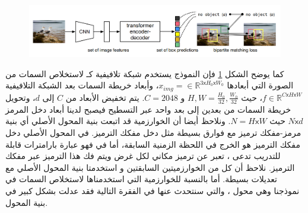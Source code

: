 \begin{figure}[h!]
	\centerline{\includegraphics[width=\textwidth]{images/DETR}}
	\caption{
	}
	\label{fig:DETR}
\end{figure}
كما يوضح الشكل
\ref{fig:DETR}
فإن النموذج يستخدم شبكة تلافيفية كـ
 لاستخلاص السمات من الصورة التي أبعادها
$x_{img} = \in \mathds{R}^{3\mathsf{x}H_0\mathsf{x}W_0}$،
وأبعاد خريطة السمات بعد الشبكة التلافيفية
$f \in \mathds{R}^{C\mathsf{x}H\mathsf{x}W}$،
حيث
$H,W = \frac{H_0}{32},\frac{W_0}{32}$
و
$C = 2048$.
يتم تخفيض الأبعاد من $C$ إلى  $d$، وتحويل خريطة السمات من بعدين إلى بعد واحد عبر التسطيح
 فيصبح لدينا أبعاد دخل المرمز
$N\mathsf{x}d$
حيث
$N=H\mathsf{x}W$.
\newline
ونلاحظ أيضا أن الخوارزمية قد اتبعت بنية المحول الأصلي أي بنية مرمز-مفكك ترميز مع فوارق بسيطة مثل دخل مفكك الترميز. في  المحول الأصلي دخل مفكك الترميز هو الخرج في اللحظة الزمنية السابقة، أما في 
فهو عبارة بارامترات قابلة للتدريب تدعى
،
تعبر عن ترميز مكاني لكل غرض ويتم فك هذا الترميز عبر مفكك الترميز.
نلاحظ أن كل من الخوارزميتين السابقتين 
و
استخدمتا بنية المحول الأصلي مع تعديلات بسيطة. أما بالنسبة  للخوارزمية التي استخدمناها لاستخلاص السمات في نموذجنا وهي محول
،
والتي سنتحدث عنها في الفقرة التالية فقد عدلت بشكل كبير في بنية المحول.
